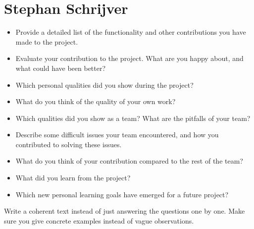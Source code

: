 \section{Stephan Schrijver}
\begin{itemize}
    \item Provide a detailed list of the functionality and other 
    contributions you have made to the project.
    \item Evaluate your contribution to the project. What are you happy 
    about, and what could have been better?
    \item Which personal qualities did you show during the project?
    \item What do you think of the quality of your own work?
    \item Which qualities did you show as a team? What are the pitfalls of your team?
    \item Describe some difficult issues your team encountered, and how you 
    contributed to solving these issues.
    \item What do you think of your contribution compared to the rest of 
    the team?
    \item What did you learn from the project?
    \item Which new personal learning goals have emerged for a future project?
\end{itemize}

Write  a  coherent  text  instead  of  just  answering  the  questions  one  by  one.   Make
sure you give concrete examples instead of vague observations.
